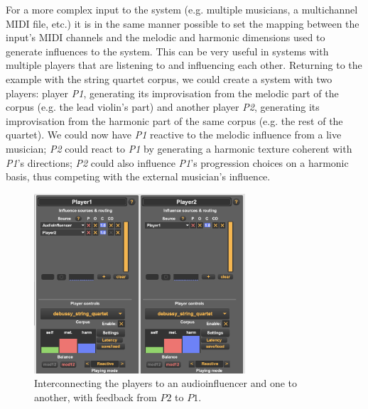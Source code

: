 For a more complex input to the system (e.g. multiple musicians, a multichannel MIDI file, etc.) it is in the same manner possible to  set the mapping between the input's MIDI channels and the melodic and harmonic dimensions used to generate influences to the system. This can be very useful in systems with multiple players that are listening to and influencing each other. Returning to the example with the string quartet corpus, we could create a system with two players: player \textit{P1}, generating its improvisation from the melodic part of the corpus (e.g. the lead violin's part) and another player \textit{P2}, generating its improvisation from the harmonic part of the same corpus (e.g. the rest of the quartet). We could now have \textit{P1} reactive to the melodic influence from a live musician; \textit{P2} could react to \textit{P1} by generating a harmonic texture coherent with \textit{P1}'s directions; \textit{P2} could also influence \textit{P1}'s progression choices on a harmonic basis, thus competing with the external musician's influence. 

 \begin{figure}[h!]
    \centering        
 	\includegraphics[width=0.7\textwidth, keepaspectratio]{img/twoplayers.png}
    \caption{Interconnecting the players to an audioinfluencer and one to another, with feedback from $P2$ to $P1$.}
    \label{fig:myFig}
\end{figure}

